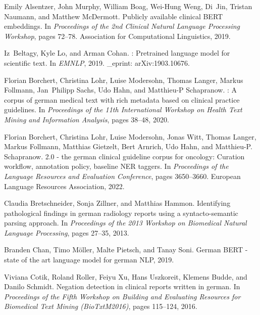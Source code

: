 \documentclass[runningheads]{llncs}
\begin{document}

\begin{thebibliography}{10}

Emily Alsentzer, John Murphy, William Boag, Wei-Hung Weng, Di~Jin, Tristan
  Naumann, and Matthew {McDermott}.
\newblock Publicly available clinical {BERT} embeddings.
\newblock In {\em Proceedings of the 2nd Clinical Natural Language Processing
  Workshop}, pages 72--78. Association for Computational Linguistics, 2019.

Iz~Beltagy, Kyle Lo, and Arman Cohan.
: Pretrained language model for scientific text.
\newblock In {\em {EMNLP}}, 2019.
\newblock \_eprint: {arXiv}:1903.10676.

Florian Borchert, Christina Lohr, Luise Modersohn, Thomas Langer, Markus
  Follmann, Jan~Philipp Sachs, Udo Hahn, and Matthieu-P Schapranow.
: A corpus of german medical text with rich metadata based on
  clinical practice guidelines.
\newblock In {\em Proceedings of the 11th International Workshop on Health Text
  Mining and Information Analysis}, pages 38--48, 2020.

Florian Borchert, Christina Lohr, Luise Modersohn, Jonas Witt, Thomas Langer,
  Markus Follmann, Matthias Gietzelt, Bert Arnrich, Udo Hahn, and Matthieu-P.
  Schapranow.
 2.0 - the german clinical guideline corpus for oncology:
  Curation workflow, annotation policy, baseline {NER} taggers.
\newblock In {\em Proceedings of the Language Resources and Evaluation
  Conference}, pages 3650--3660. European Language Resources Association, 2022.

Claudia Bretschneider, Sonja Zillner, and Matthias Hammon.
\newblock Identifying pathological findings in german radiology reports using a
  syntacto-semantic parsing approach.
\newblock In {\em Proceedings of the 2013 Workshop on Biomedical Natural
  Language Processing}, pages 27--35, 2013.

Branden Chan, Timo Möller, Malte Pietsch, and Tanay Soni.
\newblock German {BERT} - state of the art language model for german {NLP},
  2019.

Viviana Cotik, Roland Roller, Feiyu Xu, Hans Uszkoreit, Klemens Budde, and
  Danilo Schmidt.
\newblock Negation detection in clinical reports written in german.
\newblock In {\em Proceedings of the Fifth Workshop on Building and Evaluating
  Resources for Biomedical Text Mining ({BioTxtM}2016)}, pages 115--124, 2016.


\end{thebibliography}
\end{document}
